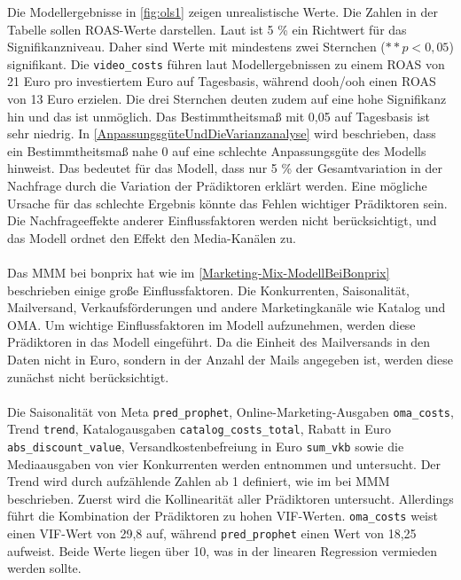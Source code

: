 Die Modellergebnisse in \autoref{fig:ols1} zeigen unrealistische Werte. Die Zahlen in der Tabelle sollen \ac{ROAS}-Werte darstellen. Laut  ist 5 \% ein Richtwert für das Signifikanzniveau. Daher sind Werte mit mindestens zwei Sternchen (\(**p < 0,05\)) signifikant. Die \verb|video_costs| führen laut Modellergebnissen zu einem \ac{ROAS} von 21 Euro pro investiertem Euro auf Tagesbasis, während \ac{dooh}/\ac{ooh} einen \ac{ROAS} von 13 Euro erzielen. Die drei Sternchen deuten zudem auf eine hohe Signifikanz hin und das ist unmöglich. Das Bestimmtheitsmaß mit 0,05 auf Tagesbasis ist sehr niedrig. In \autoref{AnpassungsgüteUndDieVarianzanalyse} wird beschrieben, dass ein Bestimmtheitsmaß nahe 0 auf eine schlechte Anpassungsgüte des Modells hinweist. Das bedeutet für das Modell, dass nur 5 \% der Gesamtvariation in der Nachfrage durch die Variation der Prädiktoren erklärt werden. Eine mögliche Ursache für das schlechte Ergebnis könnte das Fehlen wichtiger Prädiktoren sein. Die Nachfrageeffekte anderer Einflussfaktoren werden nicht berücksichtigt, und das Modell ordnet den Effekt den Media-Kanälen zu.\\\\
Das \ac{MMM} bei bonprix hat wie im \autoref{Marketing-Mix-ModellBeiBonprix} beschrieben einige große Einflussfaktoren. Die Konkurrenten, Saisonalität,  Mailversand, Verkaufsförderungen und andere Marketingkanäle wie Katalog und \ac{OMA}. Um wichtige Einflussfaktoren im Modell aufzunehmen, werden diese Prädiktoren in das Modell eingeführt. Da die Einheit des Mailversands in den Daten nicht in Euro, sondern in der Anzahl der Mails angegeben ist, werden diese zunächst nicht berücksichtigt. \\\\
Die Saisonalität von Meta \verb|pred_prophet|, Online-Marketing-Ausgaben \verb|oma_costs|, Trend \verb|trend|, Katalogausgaben \verb|catalog_costs_total|, Rabatt in Euro \verb|abs_discount_value|, Versandkostenbefreiung in Euro \verb|sum_vkb| sowie die Mediaausgaben von vier Konkurrenten werden entnommen und untersucht. Der Trend wird durch aufzählende Zahlen ab 1 definiert, wie im  bei \ac{MMM} beschrieben. Zuerst wird die Kollinearität aller Prädiktoren untersucht. Allerdings führt die Kombination der Prädiktoren zu hohen \ac{VIF}-Werten. \verb|oma_costs| weist einen \ac{VIF}-Wert von 29,8 auf, während \verb|pred_prophet| einen Wert von 18,25 aufweist. Beide Werte liegen über 10, was in der linearen Regression vermieden werden sollte.
